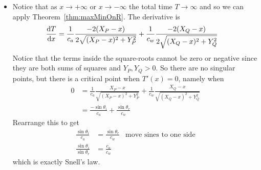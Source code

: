 \begin{eg}
\begin{itemize}
\item Notice that as $x \to +\infty$ or $x\to-\infty$ the total time $T \to
\infty$ and so we can apply Theorem~\ref{thm:maxMinOnR}. The derivative is
\begin{align*}
  \diff{T}{x} &=
  \frac{1}{c_a} \frac{-2(X_P-x)}{2\sqrt{(X_P-x)^2+Y_P^2}} +
  \frac{1}{c_w} \frac{-2(X_Q-x)}{2\sqrt{(X_Q-x)^2+Y_Q^2}}
\end{align*}
Notice that the terms inside the square-roots cannot be zero or negative since
they are both sums of squares and $Y_P,Y_Q > 0$. So there are no singular
points, but there is a critical point when $T'(x) = 0$, namely when
\begin{align*}
  0 &= \frac{1}{c_a} \frac{X_P-x}{\sqrt{(X_P-x)^2+Y_P^2}} +
  \frac{1}{c_w} \frac{X_Q-x}{\sqrt{(X_Q-x)^2+Y_Q^2}} \\
  &= \frac{-\sin\theta_i}{c_a} + \frac{\sin\theta_r}{c_w}
\end{align*}
Rearrange this to get
\begin{align*}
  \frac{\sin\theta_i}{c_a} &= \frac{\sin\theta_r}{c_w} & \text{move sines to
one side}\\
  \frac{\sin\theta_i}{\sin \theta_r} &= \frac{c_a}{c_w}
\end{align*}
which is exactly Snell's law.
\end{itemize}
\end{eg}

